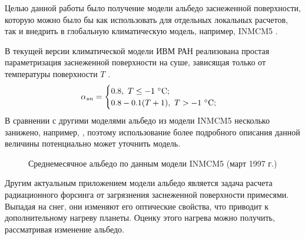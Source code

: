 \documentclass[a4paper, fontsize=14pt]{scrartcl}
\begin{document}
Целью данной работы было получение модели альбедо заснеженной поверхности, которую можно было бы как использовать для отдельных локальных расчетов, так и внедрить в глобальную климатическую модель, например, INMCM5 \cite{Volodin2017}.  

В текущей версии климатической модели ИВМ РАН реализована простая параметризация заснеженной поверхности на суше, зависящая только от температуры поверхности $T$ \cite{sysAlbOld}. 
\begin{equation}
    \alpha_{sn} = \begin{cases}
                        0.8,~ T \leq -1 ~\degree \mathrm{C}; \\
                        0.8 - 0.1(T + 1), ~T > -1 ~\degree \mathrm{C};
                  \end{cases} \label{sysAlbOld}
\end{equation}
В сравнении с другими моделями альбедо из модели INMCM5 несколько занижено, например, \cite{Flanner2007, Gueymard2019}, поэтому использование более подробного описания данной величины потенциально может уточнить модель.

\newpage
\begin{figure}[h]
    \caption{Среднемесячное альбедо по данным модели INMCM5 (март 1997 г.)}
    \label{fig:imageAlbOld}
\end{figure}


Другим актуальным приложением модели альбедо является задача расчета радиационного форсинга от загрязнения заснеженной поверхности примесями. Выпадая на снег, они изменяют его оптические свойства, что приводит к дополнительному нагреву планеты. Оценку этого нагрева можно получить, рассматривая изменение альбедо. 
\end{document}
